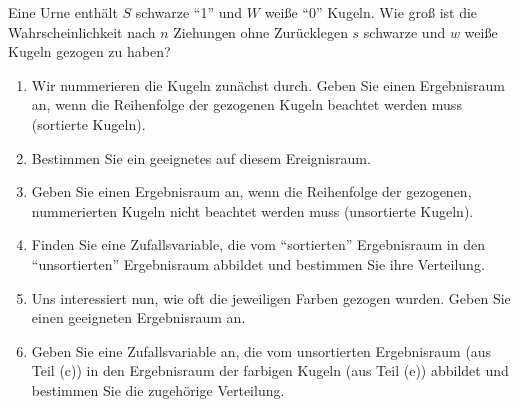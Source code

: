 \begin{exercisePage}
	\begin{exercise}
		Eine Urne enthält $S$ schwarze ``1'' und $W$ weiße ``0'' Kugeln. Wie groß ist die Wahrscheinlichkeit nach $n$ Ziehungen ohne Zurücklegen $s$ schwarze und $w$ weiße Kugeln gezogen zu haben?
		\begin{enumerate}[leftmargin=*, label=(\alph*), nolistsep]
			\item Wir nummerieren die Kugeln zunächst durch. Geben Sie einen Ergebnisraum an, wenn die Reihenfolge der gezogenen Kugeln beachtet werden muss (sortierte Kugeln).
			\item Bestimmen Sie ein geeignetes \WMass auf diesem Ereignisraum.
			\item Geben Sie einen Ergebnisraum an, wenn die Reihenfolge der gezogenen, nummerierten Kugeln nicht beachtet werden muss (unsortierte Kugeln).
			\item Finden Sie eine Zufallsvariable, die vom ``sortierten'' Ergebnisraum in den ``unsortierten'' Ergebnisraum	abbildet und bestimmen Sie ihre Verteilung.
			\item Uns interessiert nun, wie oft die jeweiligen Farben gezogen wurden. Geben Sie einen geeigneten Ergebnisraum an.
			\item Geben Sie eine Zufallsvariable an, die vom unsortierten Ergebnisraum (aus Teil (c)) in den Ergebnisraum der farbigen Kugeln (aus Teil (e)) abbildet und bestimmen Sie die zugehörige Verteilung.
		\end{enumerate}
	\end{exercise}


\end{exercisePage}
